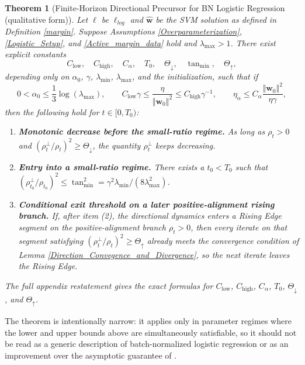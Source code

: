 \documentclass[pdflatex,sn-basic]{sn-jnl}%
\theoremstyle{thmstyleone}%
\newtheorem{theorem}{Theorem}%
\begin{document}
\begin{theorem}[Finite-Horizon Directional Precursor for BN Logistic Regression (qualitative form)]\label{logis_spike}
  Let $\ell$ be $\ell_{log}$ and $\hat{\mathbf{w}}$ be the SVM solution as defined in Definition \ref{margin}. 
  Suppose Assumptions \ref{Overparameterization}, \ref{Logistic_Setup}, and \ref{Active_margin_data} hold and $\lambda_{\max} > 1$. There exist explicit constants
  \[
    C_{\mathrm{low}}, \quad C_{\mathrm{high}}, \quad C_{\alpha}, \quad T_0, \quad \Theta_{\downarrow}, \quad \tan_{\min}, \quad \Theta_{\uparrow},
  \]
  depending only on $\alpha_0$, $\gamma$, $\lambda_{\min}$, $\lambda_{\max}$, and the initialization, such that if
  \[
    0 < \alpha_0 \le \frac{1}{3} \log \left( \lambda_{\max} \right), \qquad
    C_{\mathrm{low}} \gamma \le \frac{\eta}{\Vert \mathbf{w}_0 \Vert^2} \le C_{\mathrm{high}} \gamma^{-1}, \qquad
    \eta_{\alpha} \le C_{\alpha} \frac{\Vert \mathbf{w}_0 \Vert^2}{\eta \gamma},
  \]
  then the following hold for $t \in [0, T_0)$:
  \begin{enumerate}
    \item \textbf{Monotonic decrease before the small-ratio regime.}
    As long as $\rho_t > 0$ and $\left( {\rho_t^{\perp}}/{\rho_t} \right)^2 \ge \Theta_{\downarrow}$, the quantity $\rho_t^{\perp}$ keeps decreasing.
    \item \textbf{Entry into a small-ratio regime.}
    There exists a $t_0 < T_0$ such that
    $\left(\rho_{t_0}^{\perp}/\rho_{t_0}\right)^2 \le \tan_{\min}^2 = {\gamma^2 \lambda_{\min}}/{(8 \lambda_{\max}^2)}$.
    \item \textbf{Conditional exit threshold on a later positive-alignment rising branch.}
    If, after item (2), the directional dynamics enters a \textit{Rising Edge} segment on the positive-alignment branch $\rho_t > 0$, then every iterate on that segment satisfying
    $\left(\rho_t^{\perp} / \rho_t\right)^2 \ge \Theta_{\uparrow}$
    already meets the convergence condition of Lemma \ref{Direction_Convegence_and_Divergence}, so the next iterate leaves the \textit{Rising Edge}.
  \end{enumerate}
  The full appendix restatement gives the exact formulas for $C_{\mathrm{low}}$, $C_{\mathrm{high}}$, $C_{\alpha}$, $T_0$, $\Theta_{\downarrow}$, and $\Theta_{\uparrow}$.
\end{theorem}
\noindent The theorem is intentionally narrow: it applies only in parameter regimes where the lower and upper bounds above are simultaneously satisfiable, so it should not be read as a generic description of batch-normalized logistic regression or as an improvement over the asymptotic guarantee of \citet{implicit_bias_BN}.
\end{document}
